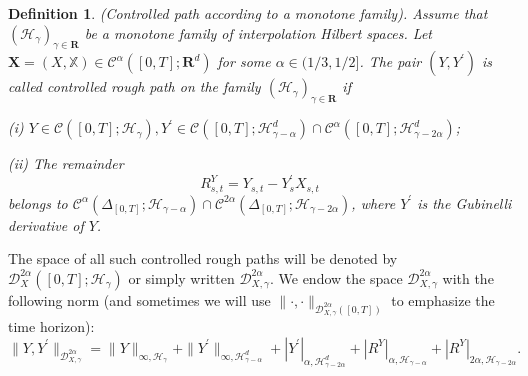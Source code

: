 \documentclass[10pt,a4paper]{article}
\newtheorem{definition}{Definition}[section]
\numberwithin{equation}{section}
\begin{document}
\begin{definition}\label{CRP}
(\textit{Controlled path according to a monotone family}).
Assume that $(\mathcal H_\gamma)_{\gamma \in \mathbf R}$ be a monotone family of interpolation Hilbert spaces.
Let $\mathbf X=(X,\mathbb{X}) \in \mathscr{C}^\alpha ([0,T]; \mathbf{R}^d)$ for some $\alpha \in (1/3,1/2]$.
The pair $(Y, Y^{\prime})$ is called controlled rough path on the family $(\mathcal H_\gamma)_{\gamma \in \mathbf R}$ if


(i) $Y\in \mathcal{C} ([0,T];\mathcal{H}_\gamma), Y^{\prime} \in \mathcal{C}([0,T]; \mathcal{H}_{\gamma-\alpha}^d) \cap \mathcal{C}^\alpha ([0,T]; \mathcal{H}_{\gamma-2\alpha}^d) $;

(ii) The remainder
	\begin{equation}\label{remainder}
		R_{s,t}^Y = Y_{s,t}-Y_s^{\prime}  X_{s,t}
	\end{equation}
belongs to $\mathcal{C}^\alpha (\Delta_{[0,T]};\mathcal{H}_{\gamma-\alpha}) \cap \mathcal{C}^{2\alpha} (\Delta_{[0,T]};\mathcal{H}_{\gamma-2\alpha})$,
where $Y^{\prime}$ is the Gubinelli derivative of $Y$.
\end{definition}	
	












The space of all such controlled rough paths will be denoted by $\mathcal{D}_{X}^{2\alpha}([0,T];\mathcal{H}_{\gamma})$ or simply written $\mathcal{D}_{X,\gamma}^{2\alpha}$.
We endow the space $\mathcal{D}_{X,\gamma}^{2\alpha}$ with the following norm (and sometimes we will use $\|\cdot, \cdot\|_{\mathcal{D}_{X,\gamma}^{2\alpha}([0,T])}$ to emphasize the time horizon):
\begin{equation}\label{norm}
	\|Y,Y^{\prime}\|_{ \mathcal{D}_{X,\gamma}^{2\alpha} }=
	\|Y\|_{\infty, \mathcal H_\gamma}
	+ \|Y^{\prime}\|_{\infty, \mathcal H_{\gamma-\alpha}^d}
	+|Y^{\prime}|_{\alpha, \mathcal H_{\gamma-2\alpha}^d}
	+|R^Y|_{\alpha, \mathcal H_{\gamma-\alpha}}
	+|R^Y|_{2\alpha,\mathcal H_{\gamma-2\alpha}} .
\end{equation}
\end{document}
